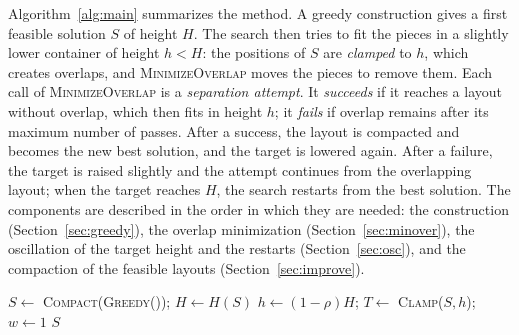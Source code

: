 \documentclass[preprint,12pt,authoryear]{elsarticle}
\begin{document}
Algorithm~\ref{alg:main} summarizes the method. A greedy construction gives a first feasible solution $S$ of
height $H$. The search then tries to fit the pieces in a slightly lower container of height $h<H$: the positions
of $S$ are \emph{clamped} to $h$, which creates overlaps, and \textsc{MinimizeOverlap} moves the pieces to remove
them. Each call of \textsc{MinimizeOverlap} is a \emph{separation attempt}. It \emph{succeeds} if it reaches a
layout without overlap, which then fits in height $h$; it \emph{fails} if overlap remains after its maximum number
of passes. After a success, the layout is compacted and becomes the new best solution, and the target is lowered
again. After a failure, the target is raised slightly and the attempt continues from the overlapping layout; when
the target reaches $H$, the search restarts from the best solution. The components are described in the order
in which they are needed: the construction (Section~\ref{sec:greedy}), the overlap minimization
(Section~\ref{sec:minover}), the oscillation of the target height and the restarts (Section~\ref{sec:osc}), and
the compaction of the feasible layouts (Section~\ref{sec:improve}).

\begin{algorithm}[t]
\caption{Overview}\label{alg:main}
$S\gets$ \textsc{Compact}(\textsc{Greedy}()); $H\gets H(S)$\;
$h\gets(1-\rho)H$; $T\gets$ \textsc{Clamp}($S,h$); $w\gets 1$
\Return $S$\;
\end{algorithm}
\end{document}

